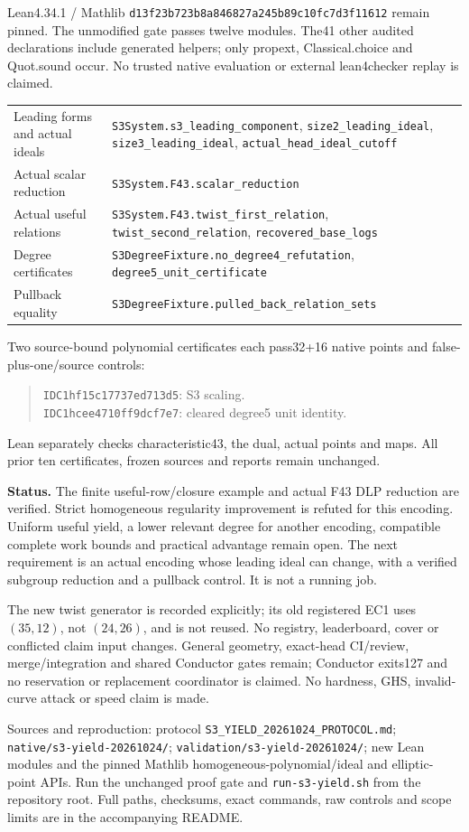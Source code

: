 \documentclass[10pt,a4paper]{article}
\newcommand{\code}[1]{\texttt{#1}}
\begin{document}
Lean4.34.1 / Mathlib \code{d13f23b723b8a846827a245b89c10fc7d3f11612} remain pinned.
The unmodified gate passes twelve modules. The41 other audited declarations
include generated helpers; only propext, Classical.choice and Quot.sound occur.
No trusted native evaluation or external lean4checker replay is claimed.

{\small\begin{tabular}{@{}p{46mm}>{\raggedright\arraybackslash}p{116mm}@{}}
Leading forms and actual ideals &\code{S3System.s3\_leading\_component}, \code{size2\_leading\_ideal}, \code{size3\_leading\_ideal}, \code{actual\_head\_ideal\_cutoff}\\
Actual scalar reduction &\code{S3System.F43.scalar\_reduction}\\
Actual useful relations &\code{S3System.F43.twist\_first\_relation}, \code{twist\_second\_relation}, \code{recovered\_base\_logs}\\
Degree certificates &\code{S3DegreeFixture.no\_degree4\_refutation}, \code{degree5\_unit\_certificate}\\
Pullback equality &\code{S3DegreeFixture.pulled\_back\_relation\_sets}
\end{tabular}}

Two source-bound polynomial certificates each pass32+16 native points and
false-plus-one/source controls:
\begin{quote}\small
\code{IDC1hf15c17737ed713d5}: S3 scaling.\\
\code{IDC1hcee4710ff9dcf7e7}: cleared degree5 unit identity.
\end{quote}
Lean separately
checks characteristic43, the dual, actual points and maps. All prior ten
certificates, frozen sources and reports remain unchanged.

\textbf{Status.} The finite useful-row/closure example and actual F43 DLP
reduction are verified. Strict homogeneous regularity improvement is refuted
for this encoding. Uniform useful yield, a lower relevant degree for another
encoding, compatible complete work bounds and practical advantage remain open.
The next requirement is an actual encoding whose leading ideal can change,
with a verified subgroup reduction and a pullback control. It is not a running job.

The new twist generator is recorded explicitly; its old registered EC1 uses
$(35,12)$, not $(24,26)$, and is not reused. No registry, leaderboard, cover or
conflicted claim input changes. General geometry, exact-head CI/review,
merge/integration and shared Conductor gates remain; Conductor exits127 and
no reservation or replacement coordinator is claimed. No hardness, GHS,
invalid-curve attack or speed claim is made.

{\footnotesize Sources and reproduction: protocol \code{S3\_YIELD\_20261024\_PROTOCOL.md};
\code{native/s3-yield-20261024/}; \code{validation/s3-yield-20261024/};
new Lean modules and the pinned Mathlib homogeneous-polynomial/ideal and
elliptic-point APIs. Run the unchanged proof gate and \code{run-s3-yield.sh}
from the repository root. Full paths, checksums, exact commands, raw controls
and scope limits are in the accompanying README.}
\end{document}
